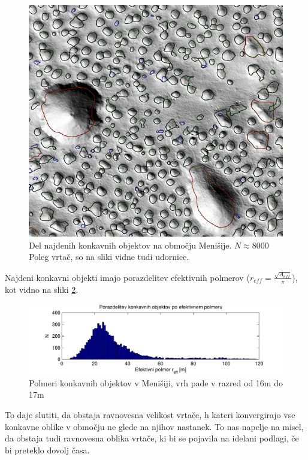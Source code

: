 \documentclass[a4paper, oneside, 12pt]{book}
\begin{document}
\begin{figure}[H]
  \begin{center}
    \includegraphics[width=13cm]{slike/menisija-vrtace}
  \end{center}
  \caption{Del najdenih konkavnih objektov na območju Menišije. $N\approx8000$ Poleg vrtač, so na sliki vidne tudi udornice.}
  \label{fig:menisija-vrtace}
\end{figure}


Najdeni konkavni objekti imajo porazdelitev efektivnih polmerov (\mbox{$r_{eff}=\frac{\sqrt{A_{eff}}}{\pi}$}), kot vidno na sliki \ref{fig:menisija-polmeri-hist}.

\begin{figure}[H]
  \centering
  \includegraphics{slike/menisija-polmeri-hist}
  \caption{Polmeri konkavnih objektov v Menišiji, vrh pade v razred od 16m do 17m}
  \label{fig:menisija-polmeri-hist}
\end{figure}

To daje slutiti, da obstaja ravnovesna velikost vrtače, h kateri konvergirajo vse konkavne oblike v območju ne glede na njihov nastanek.
To nas napelje na misel, da obstaja tudi ravnovesna oblika vrtače, ki bi se pojavila na idelani podlagi, če bi preteklo dovolj časa.
\end{document}
